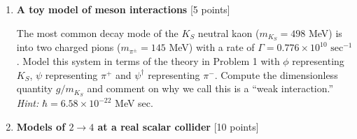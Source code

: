 \documentclass[12pt]{article}
\begin{document}
\begin{enumerate}
\begin{enumerate}
\end{enumerate}

\item {\bf A toy model of meson interactions} [5 points]

The most common decay mode of the $K_S$ neutral kaon ($m_{K_S} = 498$ MeV) is into two charged pions ($m_{\pi^\pm} = 145$ MeV) with a rate of $\Gamma = 0.776 \times 10^{10} \text{ sec}^{-1}$. Model this system in terms of the theory in Problem 1 with $\phi$ representing $K_S$, $\psi$ representing $\pi^+$ and $\psi^\dag$ representing $\pi^-$. Compute the dimensionless quantity $g/m_{K_S}$ and comment on why we call this is a ``weak interaction.'' \textit{Hint:} $\hbar = 6.58 \times 10^{-22}$ MeV sec.

\vspace{.5cm}

%
%
%
%

\item {\bf Models of $2\to 4$ at a real scalar collider} [10 points]


\end{enumerate}
\end{document}
